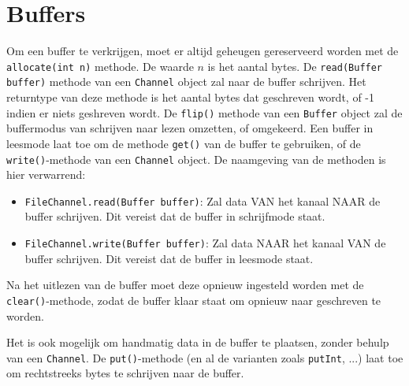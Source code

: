 \documentclass{report}
\begin{document}
\section{Buffers}
Om een buffer te verkrijgen, moet er altijd geheugen gereserveerd worden met de \texttt{allocate(int n)} methode. De waarde $n$ is het aantal bytes. De \texttt{read(Buffer buffer)} methode van een \texttt{Channel} object zal naar de buffer schrijven. Het returntype van deze methode is het aantal bytes dat geschreven wordt, of -1 indien er niets geshreven wordt. De \texttt{flip()} methode van een \texttt{Buffer} object zal de buffermodus van schrijven naar lezen omzetten, of omgekeerd. Een buffer in leesmode laat toe om de methode \texttt{get()} van de buffer te gebruiken, of de \texttt{write()}-methode van een \texttt{Channel} object. De naamgeving van de methoden is hier verwarrend: 
\begin{itemize}
	\item \texttt{FileChannel.read(Buffer buffer)}: Zal data VAN het kanaal NAAR de buffer schrijven. Dit vereist dat de buffer in schrijfmode staat.
	\item \texttt{FileChannel.write(Buffer buffer)}: Zal data NAAR het kanaal VAN de buffer schrijven. Dit vereist dat de buffer in leesmode staat.
\end{itemize}

Na het uitlezen van de buffer moet deze opnieuw ingesteld worden met de \texttt{clear()}-methode, zodat de buffer klaar staat om opnieuw naar geschreven te worden.

Het is ook mogelijk om handmatig data in de buffer te plaatsen, zonder behulp van een \texttt{Channel}. De \texttt{put()}-methode (en al de varianten zoals \texttt{putInt}, ...) laat toe om rechtstreeks bytes te schrijven naar de buffer. 
\end{document}
